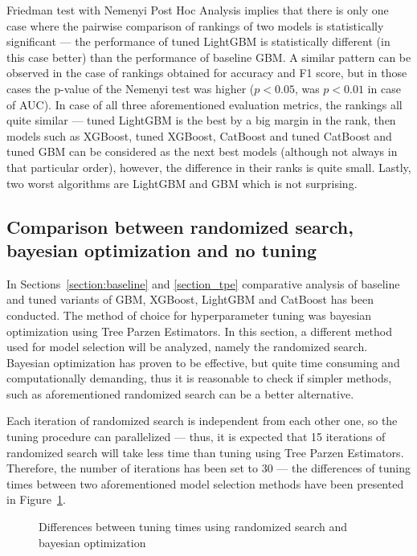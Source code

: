 \documentclass[magisterska, english]{pwr_wmat_praca_dyplomowa}
\theoremstyle{plain}
\numberwithin{theorem}{chapter}
\theoremstyle{definition}
\numberwithin{theorem}{chapter}
\newcommand{\gbm}{GBM, XGBoost, LightGBM and CatBoost }
\begin{document}
Friedman test with Nemenyi Post Hoc Analysis implies that there is only one case where the pairwise comparison of rankings of two models is statistically significant --- the performance of tuned LightGBM is statistically different (in this case better) than the performance of baseline GBM. A similar pattern can be observed in the case of rankings obtained for accuracy and F1 score, but in those cases the p-value of the Nemenyi test was higher ($p<0.05$, was $p<0.01$ in case of AUC). In case of all three aforementioned evaluation metrics, the rankings all quite similar --- tuned LightGBM is the best by a big margin in the rank, then models such as XGBoost, tuned XGBoost, CatBoost and tuned CatBoost and tuned GBM can be considered as the next best models (although not always in that particular order), however, the difference in their ranks is quite small. Lastly, two worst algorithms are LightGBM and GBM which is not surprising.   

\subsection{Comparison between randomized search, bayesian optimization and no tuning}\label{section_rand}
In Sections~\ref{section:baseline} and \ref{section_tpe} comparative analysis of baseline and tuned variants of \gbm has been conducted. The method of choice for hyperparameter tuning was bayesian optimization using Tree Parzen Estimators. In this section, a different method used for model selection will be analyzed, namely the randomized search. Bayesian optimization has proven to be effective, but quite time consuming and computationally demanding, thus it is reasonable to check if simpler methods, such as aforementioned randomized search can be a better alternative. 

Each iteration of randomized search is independent from each other one, so the tuning procedure can parallelized --- thus, it is expected that 15 iterations of randomized search will take less time than tuning using Tree Parzen Estimators. Therefore, the number of iterations has been set to 30 --- the differences of tuning times between two aforementioned model selection methods have been presented in Figure~\ref{fig:diffs}.

\begin{figure}[H]
	\centering
	\caption{Differences between tuning times using randomized search and bayesian optimization}
	\label{fig:diffs}
\end{figure}
\end{document}
